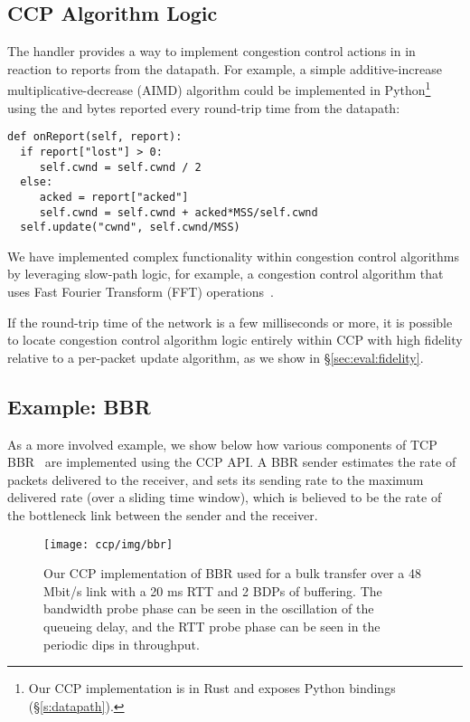 \subsection{CCP Algorithm Logic}
\label{s:ccp:ccp_algorithm_logic}
The  handler provides a way to
implement congestion control actions in \userspace in reaction to reports from the datapath.
For example, a simple additive-increase
multiplicative-decrease (AIMD) algorithm could be implemented in Python\footnote{Our CCP implementation is in Rust and exposes Python bindings (\S\ref{s:datapath}).} using
the  and  bytes reported every round-trip time from the datapath:

{\footnotesize
\begin{verbatim}
def onReport(self, report):
  if report["lost"] > 0:
     self.cwnd = self.cwnd / 2
  else:
     acked = report["acked"]
     self.cwnd = self.cwnd + acked*MSS/self.cwnd
  self.update("cwnd", self.cwnd/MSS)
\end{verbatim}
}

We have implemented complex functionality within congestion control algorithms
by leveraging slow-path logic, for example, a congestion control
algorithm that uses Fast Fourier Transform (FFT) operations~\cite{nimbus}.

If the round-trip time of the network is a few milliseconds or more,
it is possible to locate congestion control algorithm logic entirely within CCP
with high fidelity relative to a per-packet update algorithm, as we show in \S\ref{sec:eval:fidelity}.

\subsection{Example: BBR}
\label{s:ccp:bbr}
As a more involved example, we show below how various components of TCP BBR~\cite{bbr} are implemented using the CCP API.
A BBR sender estimates the rate of packets delivered to the receiver, and 
sets its sending rate to the maximum delivered rate (over a sliding time window), 
which is believed to be the rate of the bottleneck link between the sender and the receiver.

\begin{figure}
\centering
    \texttt{[image: ccp/img/bbr]}
    \caption{
    Our CCP implementation of BBR used for a bulk transfer over a 48 Mbit/s link with a 20 ms RTT and 2 BDPs of buffering. The bandwidth probe phase can be seen in the oscillation of the queueing delay, and the RTT probe phase can be seen in the periodic dips in throughput.
    }\label{fig:ccp:bbr}
\end{figure}

